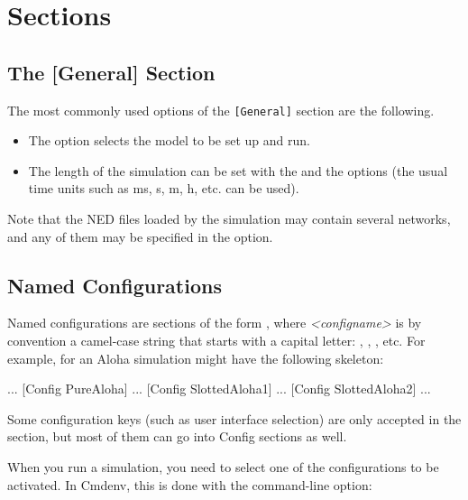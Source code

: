 \section{Sections}
\label{sec:ch-config-sim:general-section}


\subsection{The [General] Section}

The most commonly used options of the \texttt{[General]} section are the
following.

\begin{itemize}
  \item{The  option selects the model to be set up and run.}
  \item{The length of the simulation can be set with the
     and the  options (the
    usual time units such as ms, s, m, h, etc. can be used).}
\end{itemize}

Note that the NED files loaded by the simulation may contain several
networks, and any of them may be specified in the 
option.


\subsection{Named Configurations}

Named configurations are sections of the form , where
\textit{<configname>} is by convention a camel-case string that starts with a capital letter:
, , , etc. For example,
 for an Aloha simulation might have the following skeleton:

\begin{inifile}
[General]
...
[Config PureAloha]
...
[Config SlottedAloha1]
...
[Config SlottedAloha2]
...
\end{inifile}

Some configuration keys (such as user interface selection) are only
accepted in the \ttt{[General]} section, but most of them can go into Config
sections as well.

When you run a simulation, you need to select one of the configurations
to be activated. In Cmdenv, this is done with the  command-line option:


